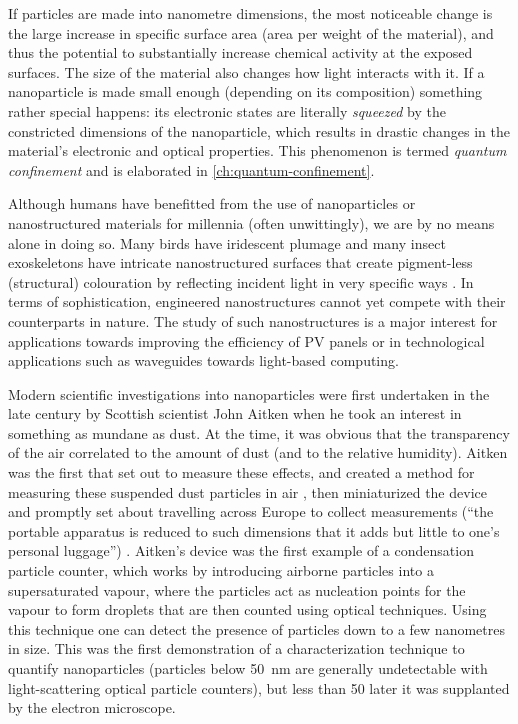 \documentclass[draft,webedition,openright,titles,swedish,english]{LuaUUThesis}\usepackage[]{graphicx}\usepackage[]{xcolor}
\begin{document}
If particles are made into nanometre dimensions, the most noticeable change is
the large increase in specific surface area (area per weight of the material),
and thus the potential to substantially increase chemical activity at the exposed surfaces.
The size of the material also changes how light interacts with it.
If a nanoparticle is made small enough (depending on its composition)
something rather special happens: its electronic states are literally
\emph{squeezed} by the constricted dimensions of the nanoparticle, which
results in drastic changes in the material's electronic and optical
properties.
This phenomenon is termed \emph{quantum confinement} and is elaborated
in \cref{ch:quantum-confinement}.

Although humans have benefitted from the use of nanoparticles or nanostructured materials
for millennia \cite{Montanarella2022} (often unwittingly), we are by no means
alone in doing so.
Many birds have iridescent plumage and many insect exoskeletons have intricate
nanostructured surfaces that create pigment-less (structural) colouration by reflecting
incident light in very specific ways \cite{Wolpert2009,Dunning2023}.
In terms of sophistication, engineered nanostructures cannot yet compete
with their counterparts in nature.
The study of such nanostructures is a major interest for applications towards
improving the efficiency of \gls{PV} panels or in technological applications such
as waveguides towards light-based computing.


Modern scientific investigations into nanoparticles were first undertaken
in the late  century by Scottish scientist John Aitken when he
took an interest in something as mundane as dust.
At the time, it was obvious that the transparency
of the air correlated to the amount of dust (and to the relative humidity).
Aitken was the first that set out to measure these effects, and created a method
for measuring these suspended dust particles in air \cite{Aitken1888},
then miniaturized the device and promptly set about travelling
across Europe to collect measurements (\enquote{the portable apparatus is reduced
to such dimensions that it adds but little to one's personal luggage}) \cite{Aitken1891}.
Aitken's device was the first example of a condensation particle counter,
which works by introducing airborne particles into a supersaturated vapour,
where the particles act as nucleation points for the vapour to form droplets
that are then counted using optical techniques.
Using this technique one can detect the presence of particles down to
a few nanometres in size.
This was the first demonstration of a characterization technique
to quantify nanoparticles (particles below \qty{50}{\nm} are generally
undetectable with light-scattering optical particle counters), but less than
\qty{50}{\years} later it was supplanted by the electron microscope.
\end{document}
